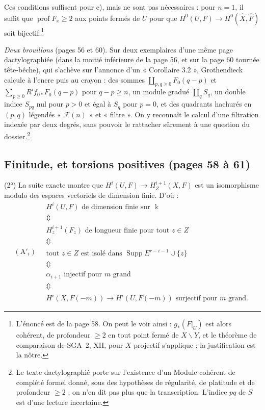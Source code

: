 \documentclass[11pt,a4paper]{article}
\begin{document}
Ces conditions suffisent pour c), mais ne sont pas nécessaires : pour $n = 1$,
il suffit que $\operatorname{prof} F_x \geq 2$ aux points fermés de $U$ pour
que $H^0(U, F) \to H^0(\widehat{X}, \widehat{F})$ soit
bijectif.\footnote{L'énoncé est de la page 58. On peut le voir ainsi :
$g_*(F|_U)$ est alors cohérent, de profondeur $\geq 2$ en tout point fermé de
$X \smallsetminus Y$, et le théorème de comparaison de SGA~2, XII, pour $X$
projectif s'applique ; la justification est la nôtre.}

\emph{Deux brouillons} (pages 56 et 60). Sur deux exemplaires d'une même page
dactylographiée (dans la moitié inférieure de la page 56, et sur la page 60
tournée tête-bêche), qui s'achève sur l'annonce d'un « Corollaire 3.2 »,
Grothendieck calcule à l'encre puis au crayon : des sommes
$\coprod_{p, q \geq 0} F_0(q - p)$ et
$\sum_{p \geq 0} R^i f_{0*} F_0(q - p)$ pour $q - p \geq n$, un module gradué
$\coprod_q S_q$, un double indice $S_{pq}$ nul pour $p > 0$ et égal à $S_q$
pour $p = 0$, et des quadrants hachurés en $(p, q)$ légendés
« $\mathcal{F}(n)$ » et « filtre ». On y reconnaît le calcul d'une
filtration indexée par deux degrés, sans pouvoir le rattacher sûrement à une
question du dossier.\footnote{Le texte dactylographié porte sur l'existence
d'un Module cohérent de complété formel donné, sous des hypothèses de
régularité, de platitude et de profondeur $\geq 2$ ; on n'en dit pas plus que
la transcription. L'indice $pq$ de $S$ est d'une lecture incertaine.}

\subsection*{Finitude, et torsions positives (pages 58 à 61)}

(2°) La suite exacte montre que $H^i(U, F) \to H^{i+1}_Z(X, F)$ est un
isomorphisme modulo des espaces vectoriels de dimension finie. D'où :
\[
(\mathrm{A}'_i) \quad
\begin{array}{l}
  H^i(U, F) \text{ de dimension finie sur } \Bbbk \\
  \Updownarrow \\
  H^{i+1}_z(F_z) \text{ de longueur finie pour tout } z \in Z \\
  \Updownarrow \\
  \text{tout } z \in Z \text{ est isolé dans } \operatorname{Supp} E^{r-i-1} \cup \lbrace z \rbrace \\
  \Updownarrow \\
  \alpha_{i+1} \text{ injectif pour } m \text{ grand} \\
  \Updownarrow \\
  H^i(X, F(-m)) \to H^i(U, F(-m)) \text{ surjectif pour } m \text{ grand.}
\end{array}
\]
\end{document}
